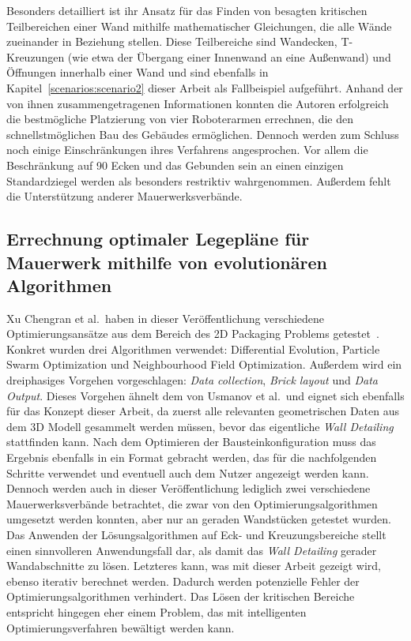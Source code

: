 Besonders detailliert ist ihr Ansatz für das Finden von besagten kritischen Teilbereichen einer Wand mithilfe mathematischer Gleichungen, die alle Wände zueinander in Beziehung stellen.
Diese Teilbereiche sind Wandecken, T-Kreuzungen (wie etwa der Übergang einer Innenwand an eine Außenwand) und Öffnungen innerhalb einer Wand und sind ebenfalls in Kapitel~\ref{scenarios:scenario2} dieser Arbeit als Fallbeispiel aufgeführt.
Anhand der von ihnen zusammengetragenen Informationen konnten die Autoren erfolgreich die bestmögliche Platzierung von vier Roboterarmen errechnen, die den schnellstmöglichen Bau des Gebäudes ermöglichen.
Dennoch werden zum Schluss noch einige Einschränkungen ihres Verfahrens angesprochen.
Vor allem die Beschränkung auf 90\textdegree{} Ecken und das Gebunden sein an einen einzigen Standardziegel werden als besonders restriktiv wahrgenommen.
Außerdem fehlt die Unterstützung anderer Mauerwerksverbände.

\subsection{Errechnung optimaler Legepläne für Mauerwerk mithilfe von evolutionären Algorithmen}
Xu Chengran et al.\ haben in dieser Veröffentlichung verschiedene Optimierungsansätze aus dem Bereich des 2D Packaging Problems getestet~\cite{Xu2021}.
Konkret wurden drei Algorithmen verwendet: Differential Evolution, Particle Swarm Optimization und Neighbourhood Field Optimization.
Außerdem wird ein dreiphasiges Vorgehen vorgeschlagen: \textit{Data collection}, \textit{Brick layout} und \textit{Data Output}.
Dieses Vorgehen ähnelt dem von Usmanov et al.\ und eignet sich ebenfalls für das Konzept dieser Arbeit, da zuerst alle relevanten geometrischen Daten aus dem 3D Modell gesammelt werden müssen, bevor das eigentliche \textit{Wall Detailing} stattfinden kann.
Nach dem Optimieren der Bausteinkonfiguration muss das Ergebnis ebenfalls in ein Format gebracht werden, das für die nachfolgenden Schritte verwendet und eventuell auch dem Nutzer angezeigt werden kann.
Dennoch werden auch in dieser Veröffentlichung lediglich zwei verschiedene Mauerwerksverbände betrachtet, die zwar von den Optimierungsalgorithmen umgesetzt werden konnten, aber nur an geraden Wandstücken getestet wurden.
Das Anwenden der Lösungsalgorithmen auf Eck- und Kreuzungsbereiche stellt einen sinnvolleren Anwendungsfall dar, als damit das \textit{Wall Detailing} gerader Wandabschnitte zu lösen.
Letzteres kann, was mit dieser Arbeit gezeigt wird, ebenso iterativ berechnet werden.
Dadurch werden potenzielle Fehler der Optimierungsalgorithmen verhindert.
Das Lösen der kritischen Bereiche entspricht hingegen eher einem Problem, das mit \glqq{}intelligenten\grqq{} Optimierungsverfahren bewältigt werden kann. 

